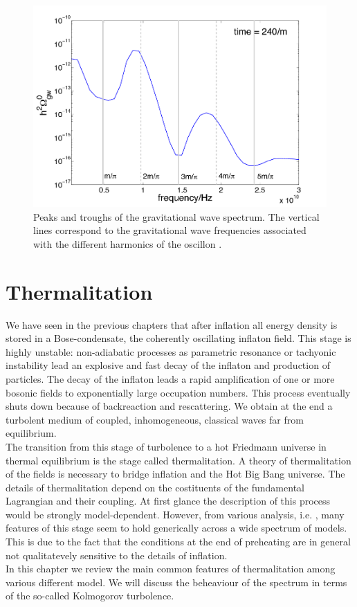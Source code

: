 \documentclass[11pt,a4paper,twoside]{book}
\begin{document}
\begin{figure}
	\centering
	\includegraphics[width=0.6\linewidth, height=0.35\textheight]{Images/Chap5/Oscillons_Fig2}
	\caption{Peaks and troughs of the gravitational wave spectrum. The vertical lines correspond to the gravitational wave frequencies associated with the different harmonics of the oscillon \cite{Chap5:GWFromOscillon}.}
	\label{fig:oscillonsfig2}
\end{figure}


\chapter{Thermalitation}
We have seen in the previous chapters that after inflation all energy density is stored in a Bose-condensate, the coherently oscillating inflaton field. This stage is highly unstable: non-adiabatic processes as parametric resonance or tachyonic instability lead an explosive and fast  decay of the inflaton and production of particles. The decay of the inflaton leads a rapid amplification of one or more bosonic fields to exponentially large occupation numbers. This process eventually shuts down because of backreaction and rescattering. We obtain  at the end a turbolent medium of coupled, inhomogeneous, classical waves far from equilibrium.\\
The transition from this stage of turbolence to a hot Friedmann universe in thermal equilibrium is the stage called thermalitation. A theory of thermalitation of the fields is necessary to bridge inflation and the Hot Big Bang universe. The details of  thermalitation depend on the costituents of the fundamental Lagrangian and their coupling. At first glance the description of this process would be strongly model-dependent. However, from various analysis, i.e. \cite{Chap6:DevelopmentEquilibrium}, many features of this stage seem to hold generically across a wide spectrum of models. This is due to the fact that the conditions at the end of preheating are in general not qualitatevely sensitive to the details of inflation.\\
In this chapter we review the main common features of thermalitation among various different model. We will discuss the beheaviour of the spectrum in terms of the so-called Kolmogorov turbolence.
\end{document}
